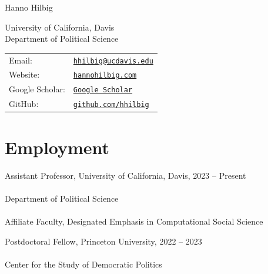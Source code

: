 \documentclass[letterpaper, 10pt]{article}
\newif\ifjobmarket
\newif\ifmerit
\def\name{Hanno Hilbig}
\renewenvironment{itemize}{
  \begin{list}{}{
    \setlength{\leftmargin}{0em}
  }
}{
  \end{list}
}
\begin{document}
{\LARGE \name}


\begin{minipage}{0.45\linewidth}
University of California, Davis \\
Department of Political Science
 \end{minipage}
\begin{minipage}{0.45\linewidth}
  \begin{tabular}{ll}
    Email: & \href{mailto:hhilbig@ucdavis.edu}{\tt hhilbig@ucdavis.edu} \\
    Website: & \href{https://www.hannohilbig.com}{\tt hannohilbig.com} \\
    Google Scholar: & \href{https://scholar.google.com/citations?user=JzQv9FMAAAAJ}{\tt Google Scholar} \\
    GitHub: & \href{https://github.com/hhilbig}{\tt github.com/hhilbig}
    \end{tabular}
\end{minipage}

\singlespacing
\ifjobmarket\ifmerit\else
  \fontsize{10.3}{12.8}\selectfont
  \setlength\emergencystretch{1em}
\fi\fi
\ifjobmarket\else
  \fontsize{9.5}{11}\selectfont
\fi

\section*{Employment}
\begin{itemize}
  \setlength\itemsep{0.3em}
  \item Assistant Professor, University of California, Davis, 2023 -- Present \\\\[-1.8ex]
	\hspace*{0.8cm} Department of Political Science \\\\[-1.8ex]
  \hspace*{0.8cm} Affiliate Faculty, Designated Emphasis in Computational Social Science
	\item Postdoctoral Fellow, Princeton University, 2022 -- 2023 \\\\[-1.8ex]
	\hspace*{0.8cm} Center for the Study of Democratic Politics

\end{itemize}
\vspace*{-0.1cm}
\end{document}

